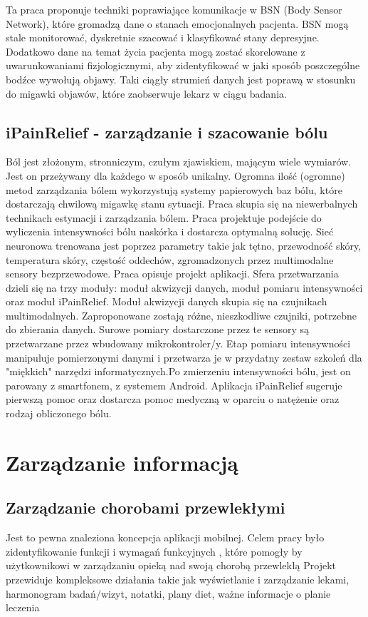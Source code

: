 Ta praca proponuje techniki poprawiające komunikacje w BSN (Body Sensor Network), które gromadzą dane o stanach emocjonalnych pacjenta. BSN  mogą stale monitorować, dyskretnie szacować i klasyfikować stany depresyjne. Dodatkowo dane na temat życia pacjenta mogą zostać skorelowane z uwarunkowaniami fizjologicznymi, aby zidentyfikować w jaki sposób poszczególne bodźce wywołują objawy. Taki ciągły strumień danych jest poprawą w stosunku do migawki objawów, które zaobserwuje lekarz w ciągu badania. 

\subsection{iPainRelief - zarządzanie i szacowanie bólu \cite{6508301}}
Ból jest złożonym, stronniczym, czułym zjawiskiem, mającym wiele wymiarów. Jest on przeżywany dla każdego w sposób unikalny. Ogromna ilość (ogromne) metod zarządzania bólem wykorzystują systemy papierowych baz bólu, które dostarczają chwilową migawkę stanu sytuacji. Praca skupia się na niewerbalnych technikach estymacji i zarządzania bólem. Praca projektuje podejście do wyliczenia intensywności bólu naskórka i dostarcza optymalną solucję. Sieć neuronowa trenowana jest poprzez parametry takie jak tętno, przewodność skóry, temperatura skóry, częstość oddechów, zgromadzonych przez multimodalne sensory bezprzewodowe. Praca opisuje projekt aplikacji. Sfera przetwarzania dzieli się na trzy moduły: moduł akwizycji danych, moduł pomiaru intensywności oraz moduł iPainRelief. Moduł akwizycji danych skupia się na czujnikach multimodalnych. Zaproponowane zostają różne, nieszkodliwe czujniki, potrzebne do zbierania danych. Surowe pomiary dostarczone przez te sensory są przetwarzane przez wbudowany mikrokontroler/y. Etap pomiaru intensywności manipuluje pomierzonymi danymi i przetwarza je w przydatny zestaw szkoleń dla "miękkich" narzędzi informatycznych.Po zmierzeniu intensywności bólu, jest on parowany z smartfonem, z systemem Android. Aplikacja iPainRelief sugeruje pierwszą pomoc oraz dostarcza pomoc medyczną w oparciu o natężenie oraz rodzaj obliczonego bólu.
 


\section{Zarządzanie informacją}
\label{sec:zarzadz_inf}

\subsection{Zarządzanie chorobami przewlekłymi \cite{6828104}}
Jest to pewna znaleziona koncepcja aplikacji mobilnej. Celem pracy było zidentyfikowanie funkcji i wymagań funkcyjnych , które pomogły by użytkownikowi w zarządzaniu opieką nad swoją chorobą przewlekłą
 Projekt przewiduje kompleksowe działania takie jak wyświetlanie i zarządzanie lekami, harmonogram badań/wizyt, notatki, plany diet, ważne informacje o planie leczenia

